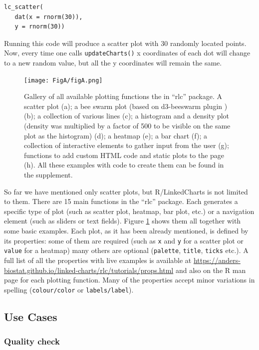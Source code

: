 \documentclass[twocolumn,10pt]{article}
\begin{document}
\begin{verbatim}
lc_scatter(
   dat(x = rnorm(30)),
   y = rnorm(30))
\end{verbatim}

Running this code will produce a scatter plot with 30 randomly located points. Now, every time one calls \texttt{updateCharts()} x coordinates of each dot will change to a new random value, but all the y coordinates will remain the same.


\begin{figure}
	\texttt{[image: FigA/figA.png]}
	\caption{Gallery of all available plotting functions the in ``rlc'' package. A scatter plot (a); a bee swarm plot (based on d3-beeswarm plugin \citep{lebeau_2017}) (b); a collection of various lines (c); a histogram and a density plot (density was multiplied by a factor of 500 to be visible on the same plot as the histogram) (d); a heatmap (e); a bar chart (f); a collection of interactive elements to gather input from the user (g); functions to add custom HTML code and static plots to the page (h). All these examples with code to create them can be found in the supplement.}
	\label{FigA}
\end{figure}

So far we have mentioned only scatter plots, but R/LinkedCharts is not limited to them. There are 15 main functions in the ``rlc'' package. Each generates a specific type of plot (such as scatter plot, heatmap, bar plot, etc.) or a navigation element (such as sliders or text fields). Figure \ref{FigA} shows them all together with some basic examples. Each plot, as it has been already mentioned, is defined by its properties: some of them are required (such as \texttt{x} and \texttt{y} for a scatter plot or \texttt{value} for a heatmap) many others are optional (\texttt{palette}, \texttt{title}, \texttt{ticks} etc.). A full list of all the properties with live examples is available at \url{https://anders-biostat.github.io/linked-charts/rlc/tutorials/props.html} and also on the R man page for each plotting function. Many of the properties accept minor variations in spelling (\texttt{colour/color} or \texttt{labels/label}).

\subsection{Use Cases}
\subsubsection{Quality check}
\end{document}
